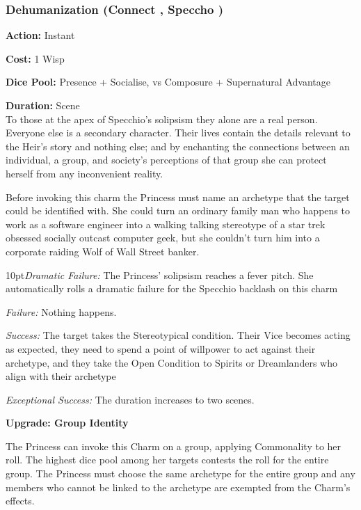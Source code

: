 \subsubsection*{Dehumanization (Connect \textbullet\textbullet\textbullet, Speccho \textbullet\textbullet\textbullet\textbullet\textbullet)}

\noindent \textbf{Action:} Instant

\noindent \textbf{Cost:} 1 Wisp

\noindent \textbf{Dice Pool:} Presence + Socialise, vs Composure + Supernatural Advantage

\noindent \textbf{Duration:} Scene \\

\noindent To those at the apex of Specchio's solipsism they alone are a real person. Everyone else is a secondary character. Their lives contain the details relevant to the Heir's story and nothing else; and by enchanting the connections between an individual, a group, and society's perceptions of that group she can protect herself from any inconvenient reality.

Before invoking this charm the Princess must name an archetype that the target could be identified with. She could turn an ordinary family man who happens to work as a software engineer into a walking talking stereotype of a star trek obsessed socially outcast computer geek, but she couldn't turn him into a corporate raiding Wolf of Wall Street banker.

\begin{myindentpar}{10pt}\emph{Dramatic Failure:} The Princess' solipsism reaches a fever pitch. She automatically rolls a dramatic failure for the Specchio backlash on this charm
    
	\emph{Failure:} Nothing happens. 
    
	\emph{Success:} The target takes the Stereotypical condition. Their Vice becomes acting as expected, they need to spend a point of willpower to act against their archetype, and they take the Open Condition to Spirits or Dreamlanders who align with their archetype
    
	\emph{Exceptional Success:} The duration increases to two scenes. 
	
	\textbf{Upgrade: Group Identity}
	
	The Princess can invoke this Charm on a group, applying Commonality to her roll. The highest dice pool among her targets contests the roll for the entire group. The Princess must choose the same archetype for the entire group and any members who cannot be linked to the archetype are exempted from the Charm's effects. 
	
	\end{myindentpar}


